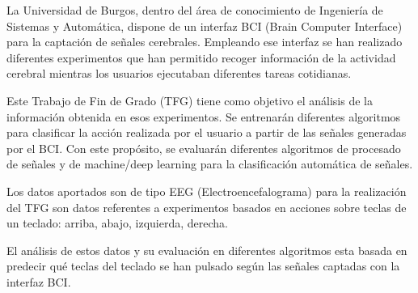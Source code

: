 
La Universidad de Burgos, dentro del área de conocimiento de Ingeniería de Sistemas y Automática, dispone de un interfaz BCI (Brain Computer Interface) para la captación de señales cerebrales. 
Empleando ese interfaz se han realizado diferentes experimentos que han permitido recoger información de la actividad cerebral mientras los usuarios ejecutaban diferentes tareas cotidianas. 

Este Trabajo de Fin de Grado (TFG) tiene como objetivo el análisis de la información obtenida en esos experimentos. Se entrenarán diferentes algoritmos para clasificar la acción realizada por el usuario a partir de las señales generadas por el BCI. Con este propósito, se evaluarán diferentes algoritmos de procesado de señales y de machine/deep learning para la clasificación automática de señales.

Los datos aportados son de tipo EEG (Electroencefalograma) para la realización del TFG son datos referentes a experimentos basados en acciones sobre teclas de un teclado: arriba, abajo, izquierda, derecha.

El análisis de estos datos y su evaluación en diferentes algoritmos esta basada en predecir qué teclas del teclado se han pulsado según las señales captadas con la interfaz BCI.


